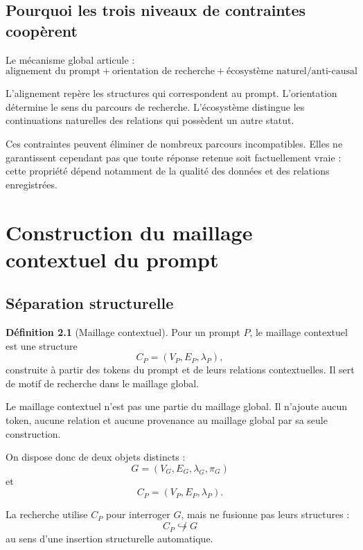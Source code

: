 \documentclass[11pt,a4paper]{report}
\theoremstyle{definition}
\newtheorem{definition}{Définition}[chapter]
\theoremstyle{plain}
\theoremstyle{remark}
\begin{document}
\section{Pourquoi les trois niveaux de contraintes coopèrent}

Le mécanisme global articule :
\[
\boxed{
\text{alignement du prompt}
+
\text{orientation de recherche}
+
\text{écosystème naturel/anti-causal}
}
\]

L'alignement repère les structures qui correspondent au prompt.
L'orientation détermine le sens du parcours de recherche.
L'écosystème distingue les continuations naturelles des relations
qui possèdent un autre statut.

Ces contraintes peuvent éliminer de nombreux parcours
incompatibles. Elles ne garantissent cependant pas que toute
réponse retenue soit factuellement vraie : cette propriété
dépend notamment de la qualité des données et des relations
enregistrées.

\chapter{Construction du maillage contextuel du prompt}

\section{Séparation structurelle}

\begin{definition}[Maillage contextuel]
Pour un prompt \(P\), le maillage contextuel est une structure
\[
C_P=(V_P,E_P,\lambda_P),
\]
construite à partir des tokens du prompt et de leurs relations
contextuelles. Il sert de motif de recherche dans le maillage
global.
\end{definition}

Le maillage contextuel n'est pas une partie du maillage global.
Il n'ajoute aucun token, aucune relation et aucune provenance
au maillage global par sa seule construction.

On dispose donc de deux objets distincts :
\[
G=(V_G,E_G,\lambda_G,\pi_G)
\]
et
\[
C_P=(V_P,E_P,\lambda_P).
\]

La recherche utilise \(C_P\) pour interroger \(G\), mais ne
fusionne pas leurs structures :
\[
C_P\not\hookrightarrow G
\]
au sens d'une insertion structurelle automatique.
\end{document}

